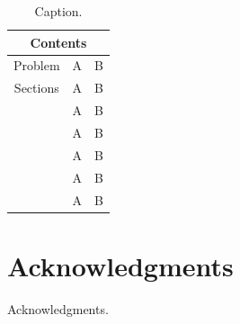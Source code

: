 \documentclass[thnuscript,10pt,number,sort&compress]{elsarticle}
\begin{document}
	\begin{table}[ht]
		\centering
		\footnotesize
		\begin{tabular}{c|c|c}
			\toprule
			\multicolumn{3}{c}{\textbf{Contents}}\\
			\midrule
			Problem & A & B\\
			\midrule
			Sections & A & B  \\
			\midrule
			\parbox[t]{2mm}{}& A & B  \\
			&  A & B \\
			& A & B \\
			& A & B  \\
			& A  & B  \\
			\bottomrule
		\end{tabular}
		\caption{
			Caption.
		}
		\label{tab:label}
	\end{table}
    
    \section*{Acknowledgments}
    Acknowledgments.
    
    
    
	
	
	\begin{appendices}
		
	\newpage
	\clearpage
	
	
	\end{appendices}
\end{document}
